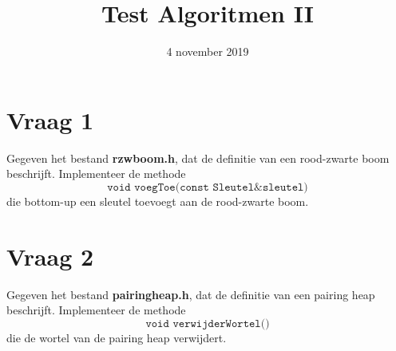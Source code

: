 \documentclass{article}
\begin{document}
\title{Test Algoritmen II}
\date{4 november 2019}
\author{}
\maketitle

\section{Vraag 1}
    Gegeven het bestand \textbf{rzwboom.h}, dat de definitie van een rood-zwarte boom beschrijft. Implementeer de methode 
    $$\texttt{void voegToe(const Sleutel\& sleutel)}$$
    die bottom-up een sleutel toevoegt aan de rood-zwarte boom. 
\section{Vraag 2}
	Gegeven het bestand \textbf{pairingheap.h}, dat de definitie van een pairing heap beschrijft. Implementeer de methode
    $$\texttt{void verwijderWortel()}$$
    die de wortel van de pairing heap verwijdert.
	
    
\end{document}
